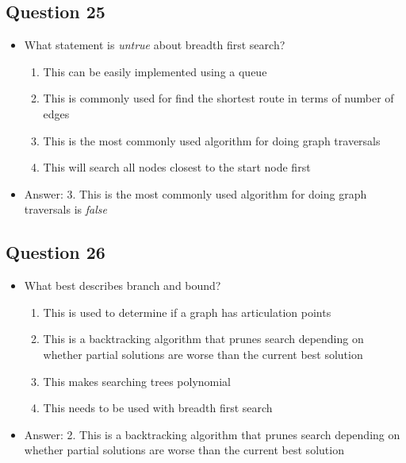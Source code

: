 \begin{slide}
\section[-1]{Question 25}

\begin{PauseHighLight}
  \begin{itemize}
  \item What statement is \emph{untrue} about breadth first search?
    \begin{enumerate}
    \item This can be easily implemented using a queue
    \item This is commonly used for find the shortest route in terms of number of edges
    \item This is the most commonly used algorithm for doing graph traversals
    \item This will search all nodes closest to the start node first\pause
    \end{enumerate}
  \item Answer: 3. This is the most commonly used algorithm for doing graph traversals is \emph{false}\pauseb
  \end{itemize}
\end{PauseHighLight}
\end{slide}

\begin{slide}
\section[-1]{Question 26}

\begin{PauseHighLight}
  \begin{itemize}
  \item What best describes branch and bound?
    \begin{enumerate}
    \item This is used to determine if a graph has articulation points
    \item This is a backtracking algorithm that prunes search depending on whether partial solutions are worse than the current best solution
    \item This makes searching trees polynomial
    \item This needs to be used with breadth first search\pause
    \end{enumerate}
  \item Answer: 2. This is a backtracking algorithm that prunes search depending on whether partial solutions are worse than the current best solution\pauseb
  \end{itemize}
\end{PauseHighLight}
\end{slide}

